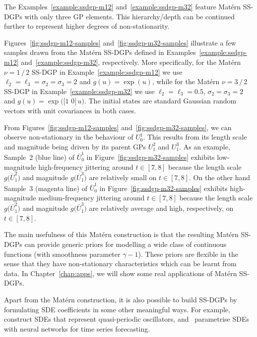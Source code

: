 The Examples~\ref{example:ssdgp-m12} and~\ref{example:ssdgp-m32} feature Mat\'{e}rn SS-DGPs with only three GP elements. This hierarchy/depth can be continued further to represent higher degrees of non-stationarity. 

Figures~\ref{fig:ssdgp-m12-samples} and~\ref{fig:ssdgp-m32-samples} illustrate a few samples drawn from the Mat\'{e}rn SS-DGPs defined in Examples~\ref{example:ssdgp-m12} and~\ref{example:ssdgp-m32}, respectively. More specifically, for the Mat\'{e}rn $\nu=1\,/\,2$ SS-DGP in Example~\ref{example:ssdgp-m12} we use $\ell_2=\ell_3=\sigma_2=\sigma_3=2$ and $g(u) = \exp(u)$, while for the Mat\'{e}rn $\nu=3\,/\,2$ SS-DGP in Example~\ref{example:ssdgp-m32} we use $\ell_2=\ell_3=0.5$, $\sigma_2=\sigma_3=2$ and $g(u) = \exp\big( \big[ 1 \,\,0 \big] \, u \big)$. The initial states are standard Gaussian random vectors with unit covariances in both cases.

From Figures~\ref{fig:ssdgp-m12-samples} and~\ref{fig:ssdgp-m32-samples}, we can observe non-stationary in the behaviour of $U^1_0$. This results from its length scale and magnitude being driven by its parent GPs $U^2_1$ and $U^3_1$. As an example, Sample~2 (blue line) of $\overline{U}^1_0$ in Figure~\ref{fig:ssdgp-m32-samples} exhibits low-magnitude high-frequency jittering around $t\in[7, 8]$ because the length scale $g\big(\overline{U}^2_1\big)$ and magnitude $g\big(\overline{U}^3_1\big)$ are relatively small on $t\in[7, 8]$. On the other hand Sample~3 (magenta line) of $\overline{U}^1_0$ in Figure~\ref{fig:ssdgp-m32-samples} exhibits high-magnitude medium-frequency jittering around $t\in[7, 8]$ because the length scale $g\big(\overline{U}^2_1\big)$ and magnitude $g\big(\overline{U}^3_1\big)$ are relatively average and high, respectively, on $t\in[7, 8]$.

The main usefulness of this Mat\'{e}rn construction is that the resulting Mat\'{e}rn SS-DGPs can provide generic priors for modelling a wide class of continuous functions (with smoothness parameter $\gamma - 1$). These priors are flexible in the sense that they have non-stationary characteristics which can be learnt from data. In Chapter~\ref{chap:apps}, we will show some real applications of Mat\'{e}rn SS-DGPs. 

Apart from the Mat\'{e}rn construction, it is also possible to build SS-DGPs by formulating SDE coefficients in some other meaningful ways. For example, \citet{Solin2014} construct SDEs that represent quasi-periodic oscillators, and~\citet{Syama2018} parametrise SDEs with neural networks for time series forecasting.

